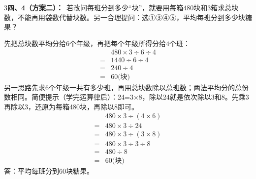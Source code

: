 \documentclass[multi=snippet,border={5bp 20bp 5bp 5bp}]{standalone}
\newenvironment{snippet}[3]{\begin{minipage}{#1bp}\color{answerred}\fontsize{#2}{#3}\selectfont\raggedright}{\end{minipage}}
\begin{document}
\begin{snippet}{505}{11.5}{14}\begin{multicols}{3}\raggedcolumns \textbf{四、4（方案二）：}\ 若改问每班分到多少“块”，就要用每箱\(480\)\allowbreak 块和\(3\)\allowbreak 箱求总块数，不能再用袋数代替块数。另一合理提问：选①③④⑤，平均每班分到多少块糖果？\par 先把总块数平均分给\(6\)\allowbreak 个年级，再把每个年级所得分给\(4\)\allowbreak 个班：\[\begin{aligned}&480\times3\div6\div4\\={}&1440\div6\div4\\={}&240\div4\\={}&60\text{(块)}\end{aligned}\]另一思路先求\(6\)\allowbreak 个年级一共有多少班，再用总块数除以总班数；两法平均分的总份数相同。简便提示（学完运算律后）：24=3×8，除以24就是依次除以3和8。先乘3再除以3，还原为每箱480块，再除以8即可。\[\begin{aligned}&480\times3\div(4\times6)\\={}&480\times3\div24\\={}&480\times3\div(3\times8)\\={}&480\times3\div3\div8\\={}&480\div8\\={}&60\text{(块)}\end{aligned}\]答：平均每班分到60块糖果。\end{multicols}\end{snippet}
\end{document}
